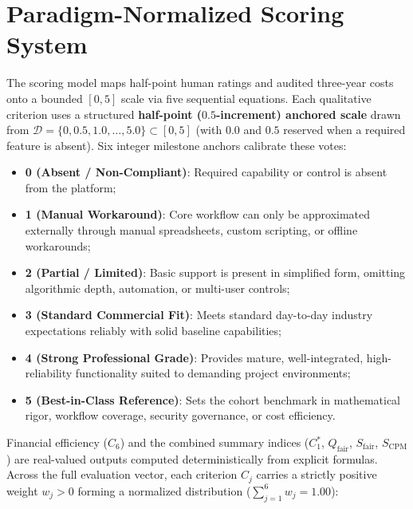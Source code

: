 \newpage

\section{Paradigm-Normalized Scoring System}
The scoring model maps half-point human ratings and audited three-year costs onto a bounded $[0, 5]$ scale via five sequential equations. Each qualitative criterion uses a structured \textbf{half-point ($0.5$-increment) anchored scale} drawn from $\mathcal{D} = \{0, 0.5, 1.0, \dots, 5.0\} \subset [0, 5]$ (with $0.0$ and $0.5$ reserved when a required feature is absent). Six integer milestone anchors calibrate these votes:
\begin{itemize}[itemsep=1pt,topsep=1pt]
    \item \textbf{0 (Absent / Non-Compliant)}: Required capability or control is absent from the platform;
    \item \textbf{1 (Manual Workaround)}: Core workflow can only be approximated externally through manual spreadsheets, custom scripting, or offline workarounds;
    \item \textbf{2 (Partial / Limited)}: Basic support is present in simplified form, omitting algorithmic depth, automation, or multi-user controls;
    \item \textbf{3 (Standard Commercial Fit)}: Meets standard day-to-day industry expectations reliably with solid baseline capabilities;
    \item \textbf{4 (Strong Professional Grade)}: Provides mature, well-integrated, high-reliability functionality suited to demanding project environments;
    \item \textbf{5 (Best-in-Class Reference)}: Sets the cohort benchmark in mathematical rigor, workflow coverage, security governance, or cost efficiency.
\end{itemize}

\noindent Financial efficiency ($C_6$) and the combined summary indices ($C_1^*$, $Q_{\text{fair}}$, $S_{\text{fair}}$, $S_{\text{CPM}}$) are real-valued outputs computed deterministically from explicit formulas. Across the full evaluation vector, each criterion $C_j$ carries a strictly positive weight $w_j > 0$ forming a normalized distribution ($\sum_{j=1}^{6} w_j = 1.00$):

